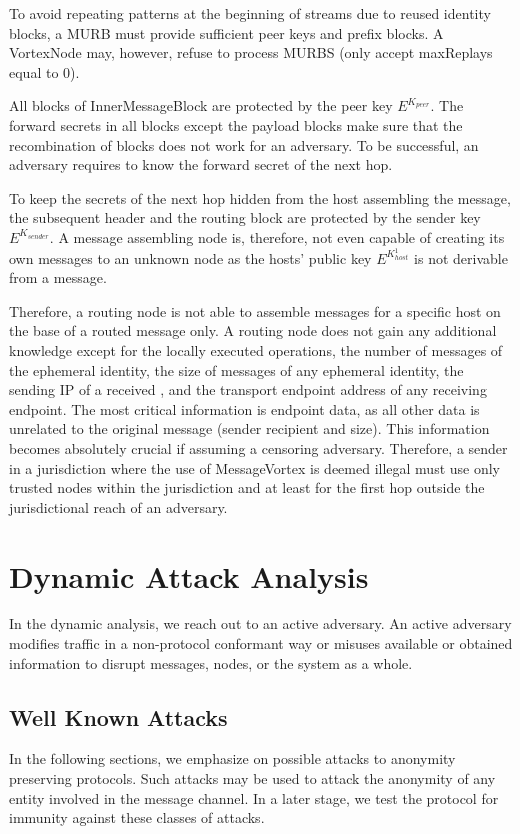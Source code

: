 To avoid repeating patterns at the beginning of streams due to reused identity blocks, a MURB must provide sufficient peer keys and prefix blocks. A VortexNode may, however, refuse to process MURBS (only accept maxReplays equal to 0).

All blocks of InnerMessageBlock are protected by the peer key $E^{K_{peer}}$. The forward secrets in all blocks except the payload blocks make sure that the recombination of blocks does not work for an adversary. To be successful, an adversary requires to know the forward secret of the next hop.

To keep the secrets of the next hop hidden from the host assembling the message, the subsequent header and the routing block are protected by the sender key $E^{K_{sender}}$. A message assembling node is, therefore, not even capable of creating its own messages to an unknown node as the hosts' public key $E^{K^{1}_{host}}$ is not derivable from a message.

Therefore, a routing node is not able to assemble messages for a specific host on the base of a routed message only. A routing node does not gain any additional knowledge except for the locally executed operations, the number of messages of the ephemeral identity, the size of messages of any ephemeral identity, the sending IP of a received \VortexMessage, and the transport endpoint address of any receiving endpoint. The most critical information is endpoint data, as all other data is unrelated to the original message (sender recipient and size). This information becomes absolutely crucial if assuming a censoring adversary. Therefore, a sender in a jurisdiction where the use of MessageVortex is deemed illegal must use only trusted nodes within the jurisdiction and at least for the first hop outside the jurisdictional reach of an adversary.


\chapter{Dynamic Attack Analysis}\label{sec:dynamicAnalysis}
In the dynamic analysis, we reach out to an active adversary. An active adversary modifies traffic in a non-protocol conformant way or misuses available or obtained information to disrupt messages, nodes, or the system as a whole.

\section{Well Known Attacks}\label{sec:wellKnownAttacks}
In the following sections, we emphasize on possible attacks to anonymity preserving protocols. Such attacks may be used to attack the anonymity of any entity involved in the message channel. In a later stage, we test the protocol for immunity against these classes of attacks.

